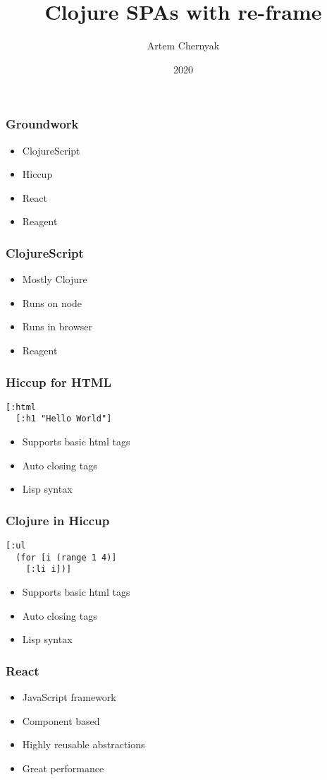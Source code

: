 \documentclass{beamer}
\title{Clojure SPAs with re-frame}
\author{Artem Chernyak}
\date{2020}
\begin{document}
  \frame{\titlepage}

  \begin{frame}
    \frametitle{Groundwork}
    \begin{itemize}
      \item ClojureScript
      \item Hiccup
      \item React
      \item Reagent
    \end{itemize}
  \end{frame}

  \begin{frame}
    \frametitle{ClojureScript}
    \begin{itemize}
      \item Mostly Clojure
      \item Runs on node
      \item Runs in browser
      \item Reagent
    \end{itemize}
  \end{frame}

  \begin{frame}[fragile]
    \frametitle{Hiccup for HTML}
    \begin{verbatim}
[:html
  [:h1 "Hello World"]
    \end{verbatim}
    \begin{itemize}
      \item Supports basic html tags
      \item Auto closing tags
      \item Lisp syntax
    \end{itemize}
  \end{frame}

  \begin{frame}[fragile]
    \frametitle{Clojure in Hiccup}
    \begin{verbatim}
[:ul
  (for [i (range 1 4)]
    [:li i])]
    \end{verbatim}
    \begin{itemize}
      \item Supports basic html tags
      \item Auto closing tags
      \item Lisp syntax
    \end{itemize}
  \end{frame}

  \begin{frame}
    \frametitle{React}
    \begin{itemize}
      \item JavaScript framework
      \item Component based
      \item Highly reusable abstractions
      \item Great performance
    \end{itemize}
  \end{frame}
\end{document}
